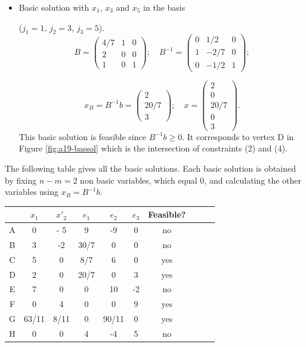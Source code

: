 \begin{enumerate}
\begin{itemize}
\item  Basic solution with $x_1$, $x_3$ and $x_5$ in the basis 

($j_1=1$, $j_2=3$, $j_3=5$).
$$B=
\begin{pmatrix} 
4/7 & 1 & 0 \\
2 & 0 & 0 \\
1 & 0 & 1 
\end{pmatrix};
\quad
B^{-1}=
\begin{pmatrix} 
0 & 1/2 & 0 \\
1 & -2/7 & 0 \\
0 & -1/2 & 1 
\end{pmatrix};
$$

$$
x_B = B^{-1}b=
\begin{pmatrix} 
2  \\
20/7 \\
3  
\end{pmatrix};
\quad
x=
\begin{pmatrix} 
2  \\
0 \\
20/7\\
0\\
3 
\end{pmatrix}.
$$  
This basic solution is  feasible since $ B^{-1}b  \geq 0$. It corresponds to vertex D in Figure  \ref{fig:a19-bassol}
which is the intersection of constraints (2) and (4).
\end{itemize}


The following table gives all the basic solutions. Each basic solution is obtained by fixing
 $n-m=2$ non basic variables, which equal  0, and calculating the other variables using  
 $ x_B=  B^{-1} b$.

\begin{center}
	\begin{tabular}{|c||c|c||c|c|c|c|c||c||c|}
		\hline
		\text{Point} & $x_1$ & $x'_2$ & $e_1$ & $e_2$ & $e_3$ & Feasible? \\
		\hline
		A & 0 & - 5 &  9 & -9 &  0 & no \\
		B & 3 & -2 & 30/7 & 0 & 0  &  no \\
		C & 5 & 0 & 8/7 & 6  & 0 & yes \\
		D & 2 & 0 & 20/7 & 0 & 3  & yes \\
		E & 7 & 0 &  0 & 10 & -2  & no  \\
		F & 0 & 4 & 0 &	 0 &  9 & yes \\
		G & 63/11 & 8/11 & 0  & 90/11 & 0  & yes\\
		H & 0 & 0 & 4  & -4  &  5 & no\\
		\hline
	\end{tabular}
\end{center}



\end{enumerate}
